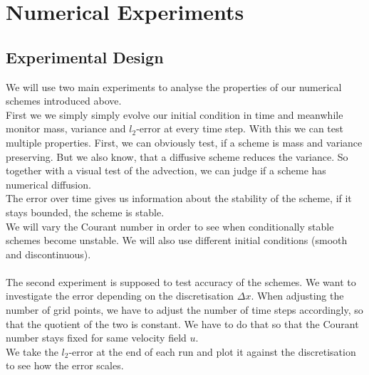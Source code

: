 \section{Numerical Experiments}
\subsection{Experimental Design}
We will use two main experiments to analyse the properties of our numerical schemes introduced above. \\
First we we simply simply evolve our initial condition in time and meanwhile monitor mass, variance and $l_2$-error at every time step. 
With this we can test multiple properties. First, we can obviously test, if a scheme is mass and variance preserving. But we also know, that a diffusive scheme reduces the variance. So together with a visual test of the advection, we can judge if a scheme has numerical diffusion. \\
The error over time gives us information about the stability of the scheme, if it stays bounded, the scheme is stable. \\
We will vary the Courant number in order to see when conditionally stable schemes become unstable. We will also use different initial conditions (smooth and discontinuous).\\ \\
The second experiment is supposed to test accuracy of the schemes. We want to investigate the error depending on the discretisation $\Delta x$. When adjusting the number of grid points, we have to adjust the number of time steps accordingly, so that the quotient of the two is constant. We have to do that so that the  Courant number stays fixed for same velocity field $u$. \\
We take the $l_2$-error at the end of each run and plot it against the discretisation to see how the error scales. 
